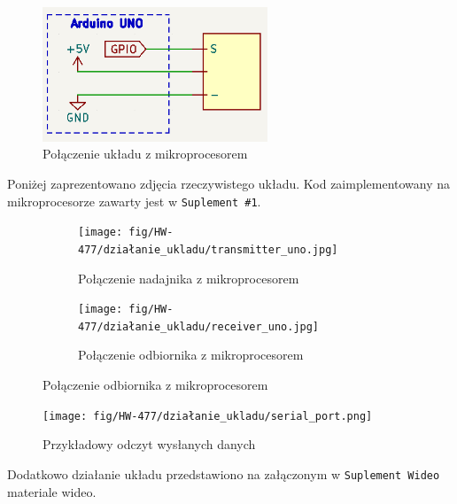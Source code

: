 \documentclass[11pt, a4paper]{article}
\begin{document}
\vspace{0.25cm}
\begin{figure}[h]
    \centering
    \includegraphics[width=0.6\textwidth]{fig/HW-477/polaczenie_modulu/adruino_con.png}
    \caption{Połączenie układu z mikroprocesorem}
    \label{fig:_polaczenie_ukladu}
\end{figure}
\vspace{0.25cm}

Poniżej zaprezentowano zdjęcia rzeczywistego układu. Kod zaimplementowany na mikroprocesorze zawarty jest w \texttt{Suplement \#1}.

\vspace{0.25cm}
\begin{figure}[h]
\centering
\begin{subfigure}{.5\textwidth}
\centering
\texttt{[image: fig/HW-477/działanie\_ukladu/transmitter\_uno.jpg]}
\caption{Połączenie nadajnika z mikroprocesorem}
\label{fig:_uklad_off}
\end{subfigure}%
\begin{subfigure}{.5\textwidth}
\centering
\texttt{[image: fig/HW-477/działanie\_ukladu/receiver\_uno.jpg]}
\caption{Połączenie odbiornika z mikroprocesorem}
\label{fig:_uklad_on}
\end{subfigure}
\label{fig:mikroproc}
\end{figure}
\vspace{0.25cm}

\vspace{0.25cm}
\begin{figure}[h]
    \centering
    \texttt{[image: fig/HW-477/działanie\_ukladu/serial\_port.png]}
    \caption{Przykładowy odczyt wysłanych danych}
    \label{fig:_serial}
\end{figure}
\vspace{0.25cm}


Dodatkowo działanie układu przedstawiono na załączonym w \texttt{Suplement Wideo} materiale 
wideo.

\newpage
\printbibliography[heading=bibintoc]
\end{document}

